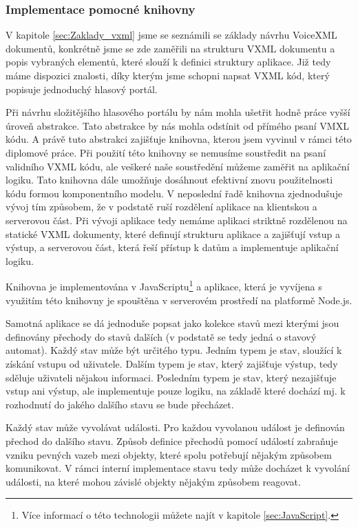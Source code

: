 \documentclass[ing,male,java,dept460]{diploma}						%
\begin{document}
\subsubsection{Implementace pomocné knihovny}

V kapitole \ref{sec:Zaklady_vxml} jsme se seznámili se základy návrhu VoiceXML dokumentů, konkrétně jsme se zde zaměřili na strukturu VXML dokumentu a popis vybraných elementů, které slouží k definici struktury aplikace. Již tedy máme dispozici znalosti, díky kterým jsme schopni napsat VXML kód, který popisuje jednoduchý hlasový portál.

Při návrhu složitějšího hlasového portálu by nám mohla ušetřit hodně práce vyšší úroveň abstrakce. Tato abstrakce by nás mohla odstínit od přímého psaní VMXL kódu. A právě tuto abstrakci zajišťuje knihovna, kterou jsem vyvinul v rámci této diplomové práce. Při použití této knihovny se nemusíme soustředit na psaní validního VXML kódu, ale veškeré naše soustředění můžeme zaměřit na aplikační logiku. Tato knihovna dále umožňuje dosáhnout efektivní znovu použitelnosti kódu formou komponentního modelu. V neposlední řadě knihovna zjednodušuje vývoj tím způsobem, že v podstatě ruší rozdělení aplikace na klientskou a serverovou část. Při vývoji aplikace tedy nemáme aplikaci striktně rozdělenou na statické VXML dokumenty, které definují strukturu aplikace a zajišťují vstup a výstup, a serverovou část, která řeší přístup k datům a implementuje aplikační logiku.

Knihovna je implementována v JavaScriptu\footnote{Více informací o této technologii můžete najít v kapitole \ref{sec:JavaScript}.} a aplikace, která je vyvíjena s využitím této knihovny je spouštěna v serverovém prostředí na platformě Node.js.

Samotná aplikace se dá jednoduše popsat jako kolekce stavů mezi kterými jsou definovány přechody do stavů dalších (v podstatě se tedy jedná o stavový automat). Každý stav může být určitého typu. Jedním typem je stav, sloužící k získání vstupu od uživatele. Dalším typem je stav, který zajišťuje výstup, tedy sděluje uživateli nějakou informaci. Posledním typem je stav, který nezajišťuje vstup ani výstup, ale implementuje pouze logiku, na základě které dochází mj. k rozhodnutí do jakého dalšího stavu se bude přecházet.

Každý stav může vyvolávat události. Pro každou vyvolanou událost je definován přechod do dalšího stavu. Způsob definice přechodů pomocí událostí zabraňuje vzniku pevných vazeb mezi objekty, které spolu potřebují nějakým způsobem komunikovat. V rámci interní implementace stavu tedy může docházet k vyvolání události, na které mohou závislé objekty nějakým způsobem reagovat.
\end{document}
